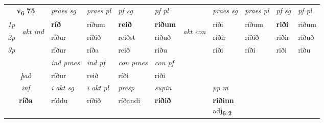 \noindent
\begin{tabular}{lllllllllll} \toprule
\multicolumn{2}{c}{\textbf{v{\textsubscript{6}}} \Large{\textbf{75}}}  &  \textit{praes sg}  & \textit{praes pl}  &\textit{ pf sg} & \textit{pf pl} &  &  \textit{praes sg}  & \textit{praes pl}  & \textit{pf sg} & \textit{pf pl } \\*
	\cmidrule{3-6} \cmidrule{8-11}
 {\textit{1p}} & \multirow{3}{*}{\begin{turn}{90}\textit{akt ind}\end{turn}} & \textbf{ríð} & ríðum & \textbf{reið} & \textbf{riðum} & \multirow{3}{*}{\begin{turn}{90}\textit{akt con}\end{turn}} &ríði & ríðum & \textbf{riði} & riðum\\*
 {\textit{2p}} &  &  ríður  & ríðið & reiðst & riðuð & & ríðir & ríðið & riðir & riðuð \\*
{\textit{3p}} &  & ríður & ríða & reið & riðu & & ríði & ríði& riði & riðu \\*
\cmidrule{3-6} \cmidrule{8-11}

   & &  \textit{ind praes} & \textit{ind pf} & \textit{con praes} & \textit{con pf} \\*
\multicolumn{2}{c}{ \textit{það} } & ríður & reið & ríði & riði \\*

\cmidrule{3-8}
   \multicolumn{2}{c}{\textit{inf}}  & \textit{i akt sg} & \textit{i akt pl}   & \textit{presp} & \textit{supin}  && \textit{pp m} \\*
  \multicolumn{2}{c}{\textbf{ríða}} & ríddu  & ríðið   & ríðandi &  \textbf{riðið}  && \specialcell{\textbf{riðinn} \\ adj\textbf{\textsubscript{6-2}}} \\*
\end{tabular}

